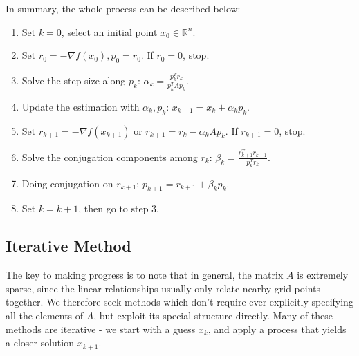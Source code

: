\documentclass{article}
\begin{document}
In summary, the whole process can be described below:
\begin{enumerate}
\item Set $k=0$, select an initial point $x_0\in\mathbb{R}^n$.
\item Set $r_0=-\nabla f(x_0), p_0= r_0$. If $ r_0=0$, stop.
\item Solve the step size along $p_k$: $\alpha_k=\frac{ p_{k}^T r_k}{ p_{k}^TA p_{k}}$.
\item Update the estimation with $\alpha_k, p_k$: $x_{k+1}=x_k+\alpha_k p_k$.
\item Set $ r_{k+1}=-\nabla f(x_{k+1})$ or $r_{k+1}=r_k-\alpha_kAp_k$. If $ r_{k+1}=0$, stop.
\item Solve the conjugation components among $r_k$: $\beta_k=\frac{r_{k+1}^Tr_{k+1}}{p_k^Tr_k}$.
\item Doing conjugation on $r_{k+1}$: $p_{k+1}= r_{k+1}+\beta_k p_k$.
\item Set $k=k+1$, then go to step 3.
\end{enumerate}

\subsection{Iterative Method}

The key to making progress is to note that in general, the matrix $A$ is extremely sparse, since the linear relationships usually only relate nearby grid points together. We therefore seek methods which don't require ever explicitly specifying all the elements of $A$, but exploit its special structure directly. Many of these methods are iterative - we start with a guess $x_k$, and apply a process that yields a closer solution $x_{k+1}$.
\end{document}
